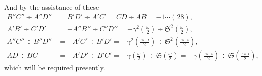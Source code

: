 \documentclass[12pt,a4paper]{article}
\newcommand{\fS}{\mathfrak{S}}
\begin{document}
\newpage
\setcounter{page}{144}

And by the assistance of these
\begin{align*}
B'' C'' \div A'' D'' &= B' D' \div A' C' = C D \div A B = -1 \cdots(28),\\
A' B' \div C' D' &= -A'' B'' \div C'' D'' = -\gamma^2\!\left(\tfrac{\omega}{2}\right) \div \fS^2\!\left(\tfrac{\omega}{2}\right),\\
A'' C'' \div B'' D'' &= -A' C' \div B' D' = -\gamma^2\!\left(\tfrac{\varpi i}{2}\right) \div \fS^2\!\left(\tfrac{\varpi i}{2}\right),\\
A D \div B C &= -A' D' \div B' C' = -\gamma\!\left(\tfrac{\omega}{2}\right) \div \fS\!\left(\tfrac{\omega}{2}\right) = -\gamma\!\left(\tfrac{\varpi i}{2}\right) \div \fS\!\left(\tfrac{\varpi i}{2}\right),
\end{align*}
which will be required presently.
\end{document}
